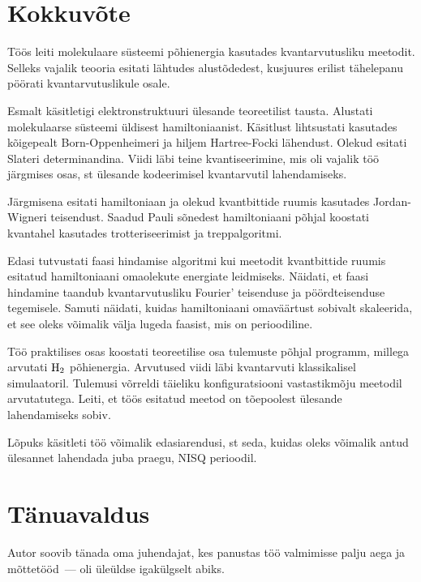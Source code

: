 \documentclass[12pt]{report}
\begin{document}
\chapter{Kokkuvõte}

Töös leiti molekulaare süsteemi põhienergia kasutades kvantarvutusliku meetodit.
Selleks vajalik teooria esitati lähtudes alustõdedest, kusjuures erilist tähelepanu pöörati kvantarvutuslikule osale.

Esmalt käsitletigi elektronstruktuuri ülesande teoreetilist tausta.
Alustati molekulaarse süsteemi üldisest hamiltoniaanist.
Käsitlust lihtsustati kasutades kõigepealt Born-Oppenheimeri ja hiljem Hartree-Focki lähendust.
Olekud esitati Slateri determinandina.
Viidi läbi teine kvantiseerimine, mis oli vajalik töö järgmises osas, st ülesande kodeerimisel kvantarvutil lahendamiseks.

Järgmisena esitati hamiltoniaan ja olekud kvantbittide ruumis kasutades Jordan-Wigneri teisendust.
Saadud Pauli sõnedest hamiltoniaani põhjal koostati kvantahel kasutades trotteriseerimist ja treppalgoritmi.

Edasi tutvustati faasi hindamise algoritmi kui meetodit kvantbittide ruumis esitatud hamiltoniaani omaolekute energiate leidmiseks.
Näidati, et faasi hindamine taandub kvantarvutusliku Fourier' teisenduse ja pöördteisenduse tegemisele.
Samuti näidati, kuidas hamiltoniaani omaväärtust sobivalt skaleerida, et see oleks võimalik välja lugeda faasist, mis on perioodiline.

Töö praktilises osas koostati teoreetilise osa tulemuste põhjal programm, millega arvutati \(\rm H_2\) põhienergia.
Arvutused viidi läbi kvantarvuti klassikalisel simulaatoril.
Tulemusi võrreldi täieliku konfiguratsiooni vastastikmõju meetodil arvutatutega.
Leiti, et töös esitatud meetod on tõepoolest ülesande lahendamiseks sobiv.

Lõpuks käsitleti töö võimalik edasiarendusi, st seda, kuidas oleks võimalik antud ülesannet lahendada juba praegu, NISQ perioodil.

\chapter*{Tänuavaldus}

Autor soovib tänada oma juhendajat, kes panustas töö valmimisse palju aega ja mõttetööd~--- oli üleüldse igakülgselt abiks.

\printbibliography[heading=bibintoc, title=Kirjandus]
\end{document}
